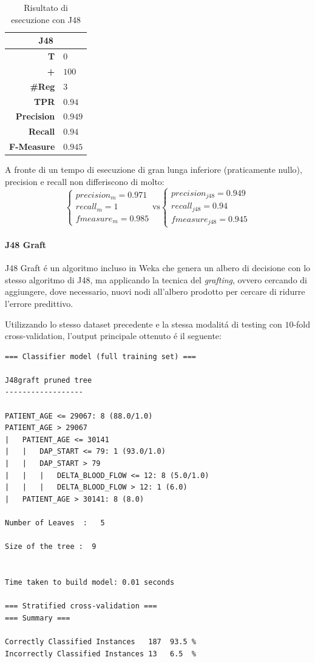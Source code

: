 \documentclass[preprint]{acm_proc_article-sp}
\begin{document}
\begin{table}[h]
\centering
\begin{tabular}{|r|l|} \hline
\multicolumn{2}{|c|}{\textbf{J48}} \\ \hline \hline 
\textbf{T} & $0$ \\ \hline
\textbf{+} & $100$ \\ \hline
\textbf{\#Reg} & $3$\\ \hline
\textbf{TPR} & $0.94$ \\ \hline
\textbf{Precision} & $0.949$ \\ \hline
\textbf{Recall} & $0.94$ \\  \hline
\textbf{F-Measure} & $0.945$ \\
\hline\end{tabular}
\caption{Risultato di esecuzione con J48}
\label{table:risultati-j48}
\end{table}

A fronte di un tempo di esecuzione di gran lunga inferiore (praticamente nullo), precision e recall non differiscono di molto:
\[
\begin{cases}
precision_m = 0.971 \\
recall_m = 1 \\
fmeasure_m = 0.985
\end{cases}
\mbox{vs}
\begin{cases}
precision_{j48} = 0.949 \\
recall_{j48} = 0.94 \\
fmeasure_{j48} = 0.945
\end{cases}
\]

\paragraph{J48 Graft} J48 Graft \'e un algoritmo incluso in Weka che genera un albero di decisione con lo stesso algoritmo di J48, ma applicando la tecnica del \textit{grafting}\cite{Webb1999}, ovvero cercando di aggiungere, dove necessario, nuovi nodi all'albero prodotto per cercare di ridurre l'errore predittivo.

Utilizzando lo stesso dataset precedente e la stessa modalit\'a di testing con $10$-fold cross-validation, l'output principale ottenuto \'e il seguente:
\begin{verbatim}
=== Classifier model (full training set) ===

J48graft pruned tree
------------------

PATIENT_AGE <= 29067: 8 (88.0/1.0)
PATIENT_AGE > 29067
|   PATIENT_AGE <= 30141
|   |   DAP_START <= 79: 1 (93.0/1.0)
|   |   DAP_START > 79
|   |   |   DELTA_BLOOD_FLOW <= 12: 8 (5.0/1.0)
|   |   |   DELTA_BLOOD_FLOW > 12: 1 (6.0)
|   PATIENT_AGE > 30141: 8 (8.0)

Number of Leaves  :   5

Size of the tree :  9


Time taken to build model: 0.01 seconds

=== Stratified cross-validation ===
=== Summary ===

Correctly Classified Instances   187  93.5 %
Incorrectly Classified Instances 13   6.5  %
\end{verbatim}
\end{document}
